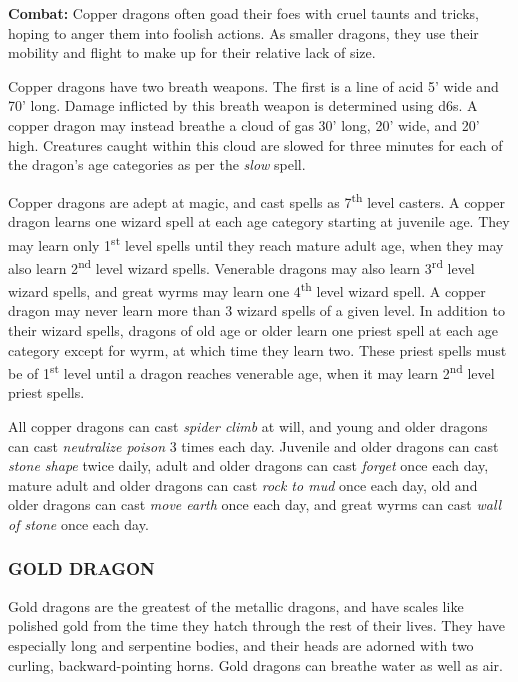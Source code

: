 \begin{multicols}{2}
\textbf{Combat:} Copper dragons often goad their foes with cruel taunts and tricks, hoping to anger them into foolish actions. As smaller dragons, they use their mobility and flight to make up for their relative lack of size.

Copper dragons have two breath weapons. The first is a line of acid 5' wide and 70' long. Damage inflicted by this breath weapon is determined using d6s. A copper dragon may instead breathe a cloud of gas 30' long, 20' wide, and 20' high. Creatures caught within this cloud are slowed for three minutes for each of the dragon's age categories as per the \textit{slow} spell.

Copper dragons are adept at magic, and cast spells as 7\textsuperscript{th} level casters. A copper dragon learns one wizard spell at each age category starting at juvenile age. They may learn only 1\textsuperscript{st} level spells until they reach mature adult age, when they may also learn 2\textsuperscript{nd} level wizard spells. Venerable dragons may also learn 3\textsuperscript{rd} level wizard spells, and great wyrms may learn one 4\textsuperscript{th} level wizard spell. A copper dragon may never learn more than 3 wizard spells of a given level. In addition to their wizard spells, dragons of old age or older learn one priest spell at each age category except for wyrm, at which time they learn two. These priest spells must be of 1\textsuperscript{st} level until a dragon reaches venerable age, when it may learn 2\textsuperscript{nd} level priest spells.

All copper dragons can cast \textit{spider climb} at will, and young and older dragons can cast \textit{neutralize poison} 3 times each day. Juvenile and older dragons can cast \textit{stone shape} twice daily, adult and older dragons can cast \textit{forget} once each day, mature adult and older dragons can cast \textit{rock to mud} once each day, old and older dragons can cast \textit{move earth} once each day, and great wyrms can cast \textit{wall of stone} once each day.

\subsubsection{GOLD DRAGON}

Gold dragons are the greatest of the metallic dragons, and have scales like polished gold from the time they hatch through the rest of their lives. They have especially long and serpentine bodies, and their heads are adorned with two curling, backward-pointing horns. Gold dragons can breathe water as well as air.


\end{multicols}
